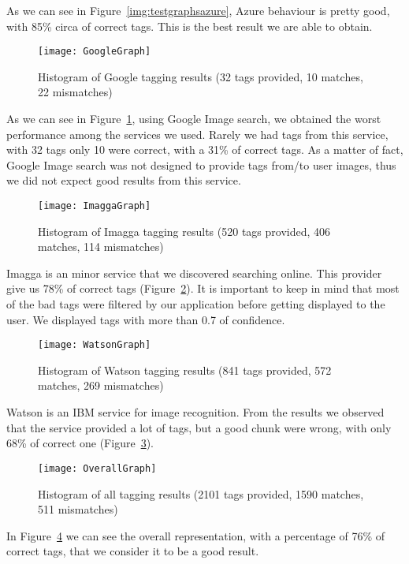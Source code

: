 As we can see in Figure~\ref{img:testgraphsazure}, Azure behaviour is pretty 
good, with 85\% circa of correct tags. This is the best result we are able to 
obtain.

\begin{figure}[H]
\centering
\texttt{[image: GoogleGraph]}
\caption{Histogram of Google tagging results (32 tags provided, 10 matches, 22 
mismatches)}
\label{img:testgraphgoogle}
\end{figure}

As we can see in Figure~\ref{img:testgraphgoogle}, using Google Image search, we 
obtained the worst performance among the services we used. Rarely we had tags 
from this service, with 32 tags only 10 were correct, with a 31\% of correct 
tags. As a matter of fact, Google Image search was not designed to provide tags 
from/to user images, thus we did not expect good results from this service.

\begin{figure}[H]
\centering
\texttt{[image: ImaggaGraph]}
\caption{Histogram of Imagga tagging results (520 tags provided, 406 matches, 
114 mismatches)}
\label{img:testgraphimagga}
\end{figure}

Imagga is an minor service that we discovered searching online. This provider 
give us 78\% of correct tags (Figure~\ref{img:testgraphimagga}). It is important 
to keep in mind that most of the bad tags were filtered by our application 
before getting displayed to the user. We displayed tags with more than 0.7 of 
confidence.

\begin{figure}[H]
\centering
\texttt{[image: WatsonGraph]}
\caption{Histogram of Watson tagging results (841 tags provided, 572 matches, 
269 mismatches)}
\label{img:testgraphwatson}
\end{figure}

Watson is an IBM service for image recognition. From the results we observed 
that the service provided a lot of tags, but a good chunk were wrong, with only 
68\% of correct one (Figure~\ref{img:testgraphwatson}).

\begin{figure}[H]
\centering
\texttt{[image: OverallGraph]}
\caption{Histogram of all tagging results (2101 tags provided, 1590 matches, 
511 mismatches)}
\label{img:testgraphoverall}
\end{figure}

In Figure~\ref{img:testgraphoverall} we can see the overall representation, with 
a percentage of 76\% of correct tags, that we consider it to be a good result.


